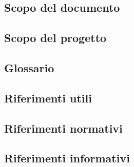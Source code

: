 \documentclass[float=false, crop=false]{standalone}
\begin{document}
	\subsection{Scopo del documento}
	

	\subsection{Scopo del progetto}


	\subsection{Glossario}

	\subsection{Riferimenti utili}

		\subsection{Riferimenti normativi}

		\subsection{Riferimenti informativi}
\end{document}
